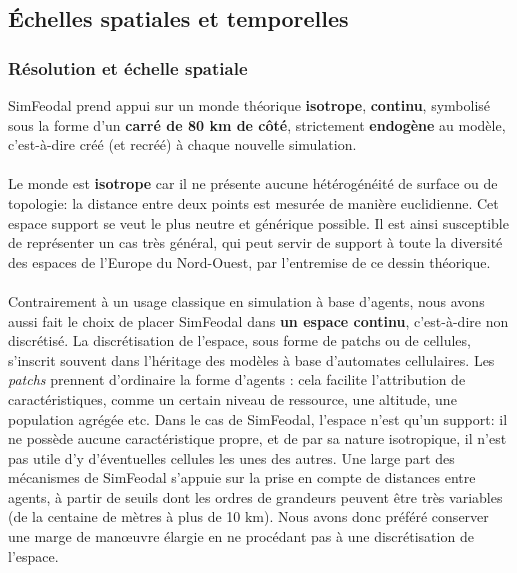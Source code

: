 
\clearpage
\subsection{Échelles spatiales et temporelles}

\subsubsection{Résolution et échelle spatiale \label{subsec:reso-spatiale}}

SimFeodal prend appui sur un monde théorique \textbf{isotrope}, \textbf{continu}, symbolisé sous la forme d'un \textbf{carré de 80 km de côté}, strictement \textbf{endogène} au modèle, c'est-à-dire créé (et recréé) à chaque nouvelle simulation.

\paragraph[Isotrope]{} Le monde est \textbf{isotrope} car il ne présente aucune hétérogénéité de surface ou de topologie: la distance entre deux points est mesurée de manière euclidienne.
Cet espace support se veut le plus neutre et générique possible.
Il est ainsi susceptible de représenter un cas très général, qui peut servir de support à toute la diversité des espaces de l'Europe du Nord-Ouest, par l'entremise de ce dessin théorique.

\paragraph[Continu]{}Contrairement à un usage classique en simulation à base d'agents, nous avons aussi fait le choix de placer SimFeodal dans \textbf{un espace continu}, c'est-à-dire non discrétisé.
La discrétisation de l'espace, sous forme de \og patchs\fg{} ou de \og cellules\fg{}, s'inscrit souvent dans l'héritage des modèles à base d'automates cellulaires.
Les \textit{patchs} prennent d'ordinaire la forme d'agents : cela facilite l'attribution de caractéristiques, comme un certain niveau de ressource, une altitude, une population agrégée etc.
Dans le cas de SimFeodal, l'espace n'est qu'un support: il ne possède aucune caractéristique propre, et de par sa nature isotropique, il n'est pas utile d'y d'éventuelles cellules les unes des autres.
Une large part des mécanismes de SimFeodal s'appuie sur la prise en compte de distances entre agents, à partir de seuils dont les ordres de grandeurs peuvent être très variables (de la centaine de mètres à plus de 10 km).
Nous avons donc préféré conserver une marge de manœuvre élargie en ne procédant pas à une discrétisation de l'espace.


